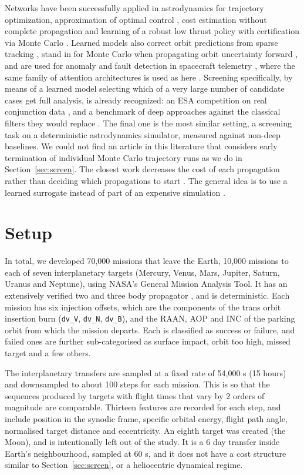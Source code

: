 \documentclass[preprint,12pt,authoryear,doubleblind]{elsarticle}
\begin{document}
Networks have been successfully applied in astrodynamics for trajectory optimization, approximation of optimal control \citep{izzo2019survey,izzo2024,sanchez2018}, cost estimation without complete propagation \citep{li2020deep,izzo2019ml} and learning of a robust low thrust policy with certification via Monte Carlo \citep{zavoli2021}. Learned models also correct orbit predictions from sparse tracking \citep{li2020orbit}, stand in for Monte Carlo when propagating orbit uncertainty forward \citep{zhou2024}, and are used for anomaly and fault detection in spacecraft telemetry \citep{ibrahim2019,naik2020}, where the same family of attention architectures is used as here \citep{jiang2023}. Screening specifically, by means of a learned model selecting which of a very large number of candidate cases get full analysis, is already recognized: an ESA competition on real conjunction data \citep{uriot2020,acciarini2021}, and a benchmark of deep approaches against the classical filters they would replace \citep{stevenson2023}. The final one is the most similar setting, a screening task on a deterministic astrodynamics simulator, measured against non-deep baselines. We could not find an article in this literature that considers early termination of individual Monte Carlo trajectory runs as we do in Section~\ref{sec:screen}. The closest work decreases the cost of each propagation rather than deciding which propagations to start \citep{massari2017,jia2022}. The general idea is to use a learned surrogate instead of part of an expensive simulation \citep{yin2022}.

\section{Setup}
\label{sec:setup}

In total, we developed 70,000 missions that leave the Earth, 10,000 missions to each of seven interplanetary targets (Mercury, Venus, Mars, Jupiter, Saturn, Uranus and Neptune), using NASA's General Mission Analysis Tool. It has an extensively verified two and three body propagator \citep{hughes2014}, and is deterministic. Each mission has six injection offsets, which are the components of the trans orbit insertion burn (\texttt{dv\_V}, \texttt{dv\_N}, \texttt{dv\_B}), and the RAAN, AOP and INC of the parking orbit from which the mission departs. Each is classified as success or failure, and failed ones are further sub-categorised as surface impact, orbit too high, missed target and a few others.

The interplanetary transfers are sampled at a fixed rate of 54,000 s (15 hours) and downsampled to about 100 steps for each mission. This is so that the sequences produced by targets with flight times that vary by 2 orders of magnitude are comparable. Thirteen features are recorded for each step, and include position in the synodic frame, specific orbital energy, flight path angle, normalised target distance and eccentricity. An eighth target was created (the Moon), and is intentionally left out of the study. It is a 6 day transfer inside Earth's neighbourhood, sampled at 60 s, and it does not have a cost structure similar to Section~\ref{sec:screen}, or a heliocentric dynamical regime.
\end{document}
